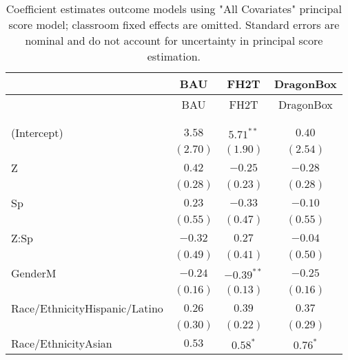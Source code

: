 

\begin{center}
\begin{longtable}{l c c c}
\hline
 & BAU & FH2T & DragonBox \\
\hline
\endfirsthead
\hline
 & BAU & FH2T & DragonBox \\
\hline
\endhead
\hline
\endfoot
\hline
\multicolumn{4}{l}{\scriptsize{$^{***}p<0.001$; $^{**}p<0.01$; $^{*}p<0.05$}}\\
\caption{Coefficient estimates outcome models using "All Covariates" principal score model; classroom fixed effects are omitted. Standard errors are nominal and do not account for uncertainty in principal score estimation.}
\label{tab:regTab}
\endlastfoot \\
(Intercept)                                        & $3.58$       & $5.71^{**}$  & $0.40$       \\
                                                   & $(2.70)$     & $(1.90)$     & $(2.54)$     \\
Z                                                  & $0.42$       & $-0.25$      & $-0.28$      \\
                                                   & $(0.28)$     & $(0.23)$     & $(0.28)$     \\
Sp                                                 & $0.23$       & $-0.33$      & $-0.10$      \\
                                                   & $(0.55)$     & $(0.47)$     & $(0.55)$     \\
Z:Sp                                               & $-0.32$      & $0.27$       & $-0.04$      \\
                                                   & $(0.49)$     & $(0.41)$     & $(0.50)$     \\
GenderM                                            & $-0.24$      & $-0.39^{**}$ & $-0.25$      \\
                                                   & $(0.16)$     & $(0.13)$     & $(0.16)$     \\
Race/EthnicityHispanic/Latino                             & $0.26$       & $0.39$       & $0.37$       \\
                                                   & $(0.30)$     & $(0.22)$     & $(0.29)$     \\
Race/EthnicityAsian                                       & $0.53$       & $0.58^{*}$   & $0.76^{*}$   \\

\end{longtable}
\end{center}
